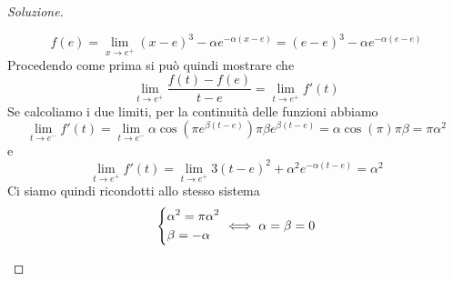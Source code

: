 \begin{proof}[Soluzione]
\begin{enumerate}[(i)]
        \[
        f(e) = \lim_{x\to e^+} (x-e)^3-\alpha e^{-\alpha(x-e)} = (e-e)^3-\alpha e^{-\alpha(e-e)}
        \]
        Procedendo come prima si può quindi mostrare che
        \[
        \lim_{t\to e^+} \frac{f(t)-f(e)}{t-e} = \lim_{t\to e^+}f'(t)
        \]
        Se calcoliamo i due limiti, per la continuità delle funzioni abbiamo
        \[
        \lim_{t\to e^-}f'(t) = \lim_{t\to e^-} \alpha \cos(\pi e^{\beta(t-e)})\pi \beta e^{\beta(t-e)} = \alpha \cos(\pi) \pi \beta = \pi\alpha^2
        \]
        e 
        \[
        \lim_{t\to e^+} f'(t) = \lim_{t\to e^+} 3(t-e)^2 + \alpha^2 e^{-\alpha(t-e)} = \alpha^2
        \]
        Ci siamo quindi ricondotti allo stesso sistema
        \[
        \begin{dcases}
            \alpha^2 = \pi \alpha^2\\
            \beta = - \alpha
        \end{dcases} \iff \alpha=\beta = 0
        \]
    \end{enumerate}
\end{proof}
\newpage
